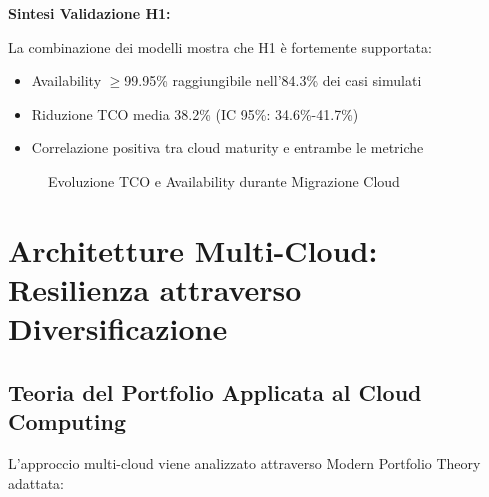\textbf{Sintesi Validazione H1:}

La combinazione dei modelli mostra che H1 è fortemente supportata:
\begin{itemize}
\item Availability $\geq$99.95\% raggiungibile nell'84.3\% dei casi simulati
\item Riduzione TCO media 38.2\% (IC 95\%: 34.6\%-41.7\%)
\item Correlazione positiva tra cloud maturity e entrambe le metriche
\end{itemize}

\begin{figure}[H]
\centering
{}
\caption{Evoluzione TCO e Availability durante Migrazione Cloud}
\end{figure}

\section{Architetture Multi-Cloud: Resilienza attraverso Diversificazione}

\subsection{Teoria del Portfolio Applicata al Cloud Computing}

L'approccio multi-cloud viene analizzato attraverso Modern Portfolio Theory adattata:

